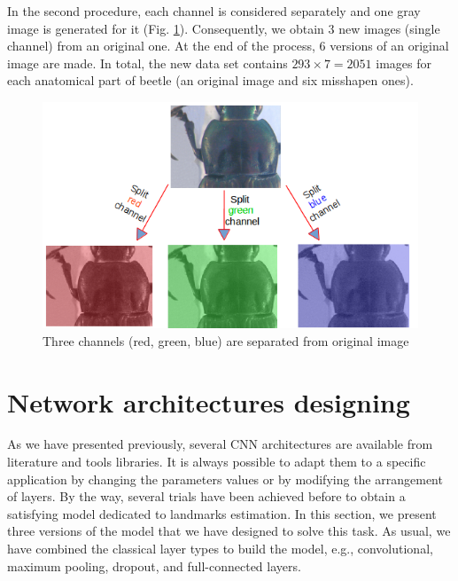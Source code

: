 \documentclass[review]{elsarticle}
\begin{document}
In the second procedure, each channel is considered separately and one gray image is generated for it (Fig. \ref{figaug2}). Consequently, we obtain 3 new images (single channel) from an original one. At the end of the process, $6$ versions of an original image are made. In total, the new data set contains $293 \times 7 = 2051$ images for each anatomical part of beetle (an original image and six misshapen ones).

\begin{figure}[h]
	\centering
	\includegraphics[scale=0.4]{images/sp_channels}
	\caption{Three channels (red, green, blue) are separated from original image}
	\label{figaug2}
\end{figure}

\section{Network architectures designing}
\label{Sneuralnetwork}
As we have presented previously, several CNN architectures are available from literature and tools libraries. It is always possible to adapt them to a specific application by changing the parameters values or by modifying the arrangement of layers. By the way, several trials have been achieved before to obtain a satisfying model dedicated to landmarks estimation. In this section, we present three versions of the model that we have designed to solve this task. As usual, we have combined the classical layer types to build the model, e.g., convolutional, maximum pooling, dropout, and full-connected layers.
\end{document}
